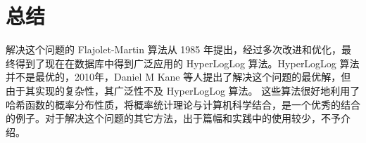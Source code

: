 \documentclass{ctexart}
\begin{document}
\section{总结}
    解决这个问题的 Flajolet-Martin 算法从 1985 年提出，经过多次改进和优化，最终得到了现在在数据库中得到广泛应用的 HyperLogLog 算法。HyperLogLog 算法并不是最优的，2010年，Daniel M Kane 等人提出了解决这个问题的最优解，但由于其实现的复杂性，其广泛性不及 HyperLogLog 算法。\cite{Kane:2010fp} 这些算法很好地利用了哈希函数的概率分布性质，将概率统计理论与计算机科学结合，是一个优秀的结合的例子。对于解决这个问题的其它方法，出于篇幅和实践中的使用较少，不予介绍。

\printbibliography[title=引用文献]
\end{document}

